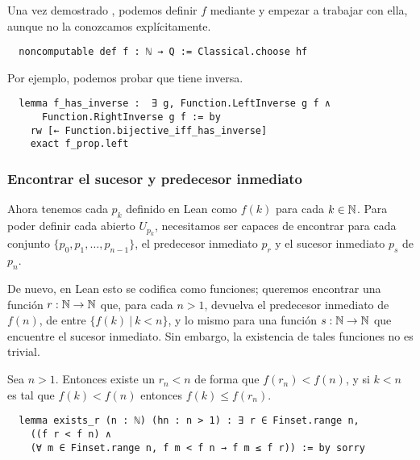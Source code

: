 Una vez demostrado , podemos definir $f$ mediante  y empezar a trabajar con ella, aunque no la conozcamos explícitamente.

\begin{lstlisting}
  noncomputable def f : ℕ → Q := Classical.choose hf
\end{lstlisting}

Por ejemplo, podemos probar que tiene inversa.

\begin{lstlisting}
  lemma f_has_inverse :  ∃ g, Function.LeftInverse g f ∧
      Function.RightInverse g f := by
    rw [← Function.bijective_iff_has_inverse]
    exact f_prop.left
\end{lstlisting}

\subsubsection{Encontrar el sucesor y predecesor inmediato}

Ahora tenemos cada $p_k$ definido en Lean como $f(k)$ para cada $k \in \mathbb{N}$. Para poder definir cada abierto $U_{p_k}$, necesitamos ser capaces de encontrar para cada conjunto $\{p_0, p_1, \dots, p_{n-1}\}$, el predecesor inmediato $p_r$ y el sucesor inmediato $p_s$ de $p_{n}$.

De nuevo, en Lean esto se codifica como funciones; queremos encontrar una función $r : \mathbb{N} \to \mathbb{N}$ que, para cada $n>1$, devuelva el predecesor inmediato de $f(n)$, de entre $\{f(k) ~|~ k < n\}$, y lo mismo para una función $s : \mathbb{N} \to \mathbb{N}$ que encuentre el sucesor inmediato. Sin embargo, la existencia de tales funciones no es trivial.

\begin{lemma}
  Sea $n > 1$. Entonces existe un $r_n < n$ de forma que $f(r_n) < f(n)$, y si $k < n$ es tal que $f(k) < f(n)$ entonces $f(k) \leq f(r_n)$.
\end{lemma}

\begin{lstlisting}
  lemma exists_r (n : ℕ) (hn : n > 1) : ∃ r ∈ Finset.range n,
    ((f r < f n) ∧
    (∀ m ∈ Finset.range n, f m < f n → f m ≤ f r)) := by sorry
\end{lstlisting}

